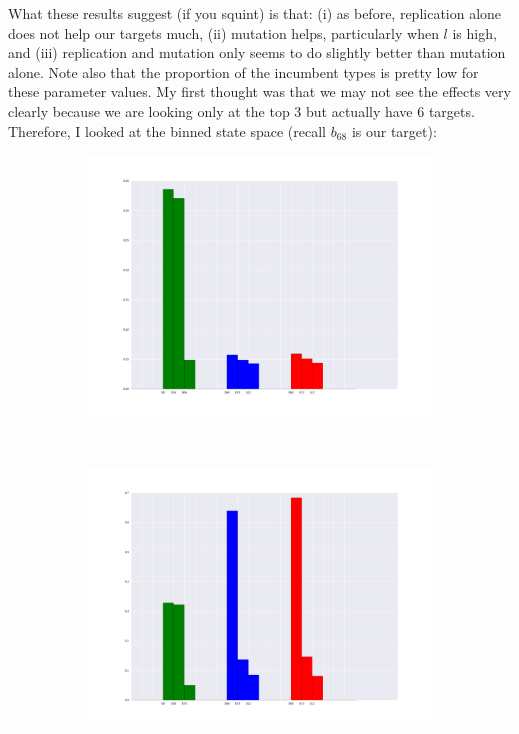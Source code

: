 \documentclass[a4paper]{article}
\begin{document}
What these results suggest (if you squint) is that: (i) as before, replication alone does not help our targets much, (ii) mutation helps, particularly when $l$ is high, and (iii) replication and mutation only seems to do slightly better than mutation alone. Note also that the proportion of the incumbent types is pretty low for these parameter values. My first thought was that we may not see the effects very clearly because we are looking only at the top $3$ but actually have $6$ targets. Therefore, I looked at the binned state space (recall $b_{68}$ is our target):


\begin{figure}[h!]
  \centering
  \begin{subfigure}[b]{0.45\textwidth}
    \includegraphics[scale=0.25]{../code-LOT-extension/plots/rmd-l30-a1-k5-l1-meFalse432_binned.png}
  \end{subfigure}
  ~
   \begin{subfigure}[b]{0.45\textwidth}
    \includegraphics[scale=0.25]{../code-LOT-extension/plots/rmd-l30-a1-k5-l10-meFalse432_binned.png}

\end{subfigure}
\end{figure}
\end{document}
